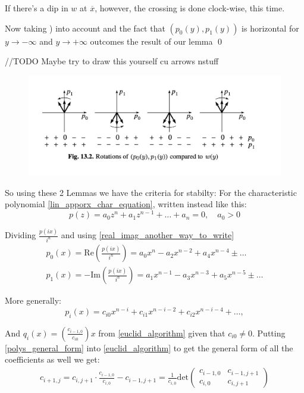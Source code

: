 If there's a dip in $w$ at $\overline{x}$, however, the crossing is
done clock-wise, this time.

Now taking ) into account and the fact that $(p_0(y), p_1(y))$
is horizontal for $y \rightarrow  - \infty$ and $y \rightarrow +
\infty  $ outcomes the result of our lemma
\qed

\hfill\break
//TODO Maybe try to draw this yourself cu arrows nstuff
\hfill\break

\begin{figure}
\includegraphics[width=13cm]{math_pics/sageti-cumse-invart.png}
\centering
\end{figure}

So using these 2 Lemmas we have the criteria for stabilty:
For the characteristic polynomial \ref{lin_apporx_char_equation},
written instead like this:
\[
p(z)=a_0 z^n + a_1z^{n-1} + \dots + a_n = 0, \quad a_0 > 0
\]

Dividing $\frac{p(i x)}{i^n}$ and using \ref{real_imag_another_way_to_write}
\begin{gather}
p_0(x)= \text{Re}(\frac{p(i x)}{i^n}) = a_0 x^{n} -a_2 x^{n-2} + a_4
x^{n-4} \pm \dots \\
p_1(x)= -\text{Im} (\frac{p(i x)}{i^n}) = a_1 x^{n-1} -a_3 x^{n-3} +
a_5 x^{n-5} \pm \dots
\end{gather}

More generally:
\begin{equation}\label{polys_general_form}
p_i(x) = c_{i0} x^{n-i} + c_{i1} x^{n-i-2} + c_{ i2 } x^{ n-i-4  } +
\dots, \tag{Gen. Form}
\end{equation}

And $q_i(x) = (  \frac{c_{ i-1 ,0}}{c_{ i0 }} )x$ from
\ref{euclid_algorithm} given that $c_{i0} \neq 0$.
Putting \ref{polys_general_form} into \ref{euclid_algorithm} to get
the general form of all the coefficients as well we get:
\begin{align}\label{coeff_gen_form}
c_{i+1,j} = c_{i,j+1} \cdot \frac{c_{i-1,0}}{c_{i,0}} - c_{i-1,j+1 }
= \frac{1}{c_{i,0}} \text{det}
\begin{pmatrix}
c_{i-1,0} & c_{i-1, j+1} \\
c_{i,0} & c_{i, j+1} \tag{Coeff.}
\end{pmatrix}
\end{align}

